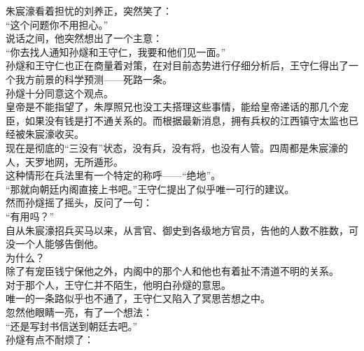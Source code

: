 \begin{multicols}{\theparacolNo}
朱宸濠看着担忧的刘养正，突然笑了：\\

“这个问题你不用担心。”\\

说话之间，他突然想出了一个主意：\\

“你去找人通知孙燧和王守仁，我要和他们见一面。”\\

孙燧和王守仁也正在商量着对策，在对目前态势进行仔细分析后，王守仁得出了一个我方前景的科学预测——死路一条。\\

孙燧十分同意这个观点。\\

皇帝是不能指望了，朱厚照兄也没工夫搭理这些事情，能给皇帝递话的那几个宠臣，如果没有钱是打不通关系的。而根据最新消息，拥有兵权的江西镇守太监也已经被朱宸濠收买。\\

现在是彻底的“三没有”状态，没有兵，没有将，也没有人管。四周都是朱宸濠的人，天罗地网，无所遁形。\\

这种情形在兵法里有一个特定的称呼——“绝地”。\\

“那就向朝廷内阁直接上书吧。”王守仁提出了似乎唯一可行的建议。\\

然而孙燧摇了摇头，反问了一句：\\

“有用吗？”\\

自从朱宸濠招兵买马以来，从言官、御史到各级地方官员，告他的人数不胜数，可没一个人能够告倒他。\\

为什么？\\

除了有宠臣钱宁保他之外，内阁中的那个人和他也有着扯不清道不明的关系。\\

对于那个人，王守仁并不陌生，他明白孙燧的意思。\\

唯一的一条路似乎也不通了，王守仁又陷入了冥思苦想之中。\\

忽然他眼睛一亮，有了一个想法：\\

“还是写封书信送到朝廷去吧。”\\

孙燧有点不耐烦了：\\


\end{multicols}

